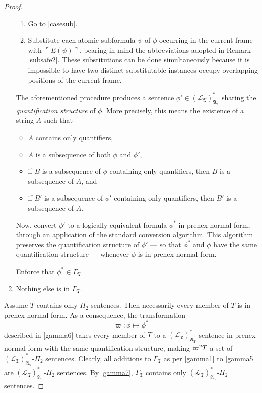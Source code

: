 \documentclass[12pt, twoside]{memoir}
\numberwithin{equation}{section}
\theoremstyle{definition}
\theoremstyle{remark}
\theoremstyle{definition}
\theoremstyle{definition}
\theoremstyle{definition}
\theoremstyle{remark}
\begin{document}
\begin{proof}
\begin{enumerate}[label=(\arabic*)]
\begin{enumerate}[label=(\Alph*)]
        \item\label{endloop} Go to \ref{casesub}.
        
        \item\label{atomsub} Substitute each atomic subformula $\psi$ of $\phi$ occurring in the current frame with $\ulcorner E(\psi) \urcorner$, bearing in mind the abbreviations adopted in Remark \ref{subsafe2}. These substitutions can be done simultaneously because it is impossible to have two distinct substitutable instances occupy overlapping positions of the current frame.
    \end{enumerate}
    The aforementioned procedure produces a sentence $\phi' \in ({\mathcal{L}_{\mathfrak{T}}})^*_{\mathfrak{A}_{\mathfrak{T}}}$ sharing the \emph{quantification structure} of $\phi$. More precisely, this means the existence of a string $A$ such that
    \begin{itemize}
        \item $A$ contains only quantifiers,
        \item $A$ is a subsequence of both $\phi$ and $\phi'$,
        \item if $B$ is a subsequence of $\phi$ containing only quantifiers, then $B$ is a subsequence of $A$, and
        \item if $B'$ is a subsequence of $\phi'$ containing only quantifiers, then $B'$ is a subsequence of $A$.
    \end{itemize}
    Now, convert $\phi'$ to a logically equivalent formula $\phi^*$ in prenex normal form, through an application of the standard conversion algorithm. This algorithm preserves the quantification structure of $\phi'$ --- so that $\phi^*$ and $\phi$ have the same quantification structure --- whenever $\phi$ is in prenex normal form.
    
    Enforce that $\phi^* \in \Gamma_{\mathfrak{T}}$. 
    \item\label{gamma7} Nothing else is in $\Gamma_{\mathfrak{T}}$.
\end{enumerate}

Assume $T$ contains only $\Pi_2$ sentences. Then necessarily every member of $T$ is in prenex normal form. As a consequence, the transformation $$\varpi : \phi \mapsto \phi^*$$ described in \ref{gamma6} takes every member of $T$ to a $({\mathcal{L}_{\mathfrak{T}}})^{*}_{\mathfrak{A}_{\mathfrak{T}}}$ sentence in prenex normal form with the same quantification structure, making $\varpi"T$ a set of $({\mathcal{L}_{\mathfrak{T}}})^{*}_{\mathfrak{A}_{\mathfrak{T}}}$-$\Pi_2$ sentences. Clearly, all additions to $\Gamma_{\mathfrak{T}}$ as per \ref{gamma1} to \ref{gamma5} are $({\mathcal{L}_{\mathfrak{T}}})^{*}_{\mathfrak{A}_{\mathfrak{T}}}$-$\Pi_2$ sentences. By \ref{gamma7}, $\Gamma_{\mathfrak{T}}$ contains only $({\mathcal{L}_{\mathfrak{T}}})^{*}_{\mathfrak{A}_{\mathfrak{T}}}$-$\Pi_2$ sentences.
\end{proof}
\end{document}
